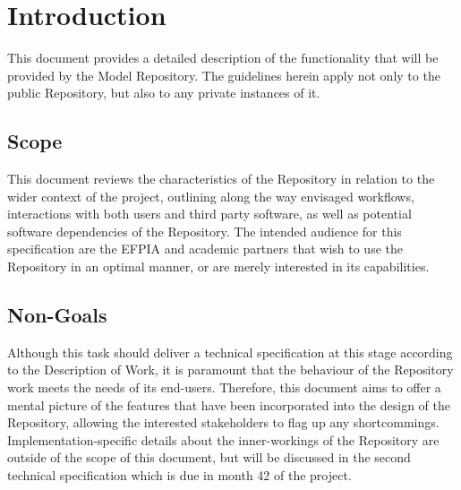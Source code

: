 \section{Introduction}
\label{introduction}
This document provides a detailed description of the functionality that will be provided by the \ddmore Model Repository. The guidelines herein apply not only to the public Repository, but also to any private instances of it.

\subsection{Scope}
This document reviews the characteristics of the Repository in relation to the wider context of the project, outlining along the way envisaged workflows, interactions with both users and third party software, as well as potential software dependencies of the Repository. The intended audience for this specification are the EFPIA and academic partners that wish to use the Repository in an optimal manner, or are merely interested in its capabilities.

\subsection{Non-Goals}
Although this task should deliver a technical specification at this stage according to the Description of Work, it is paramount that the behaviour of the Repository work meets the needs of its end-users. Therefore, this document aims to offer a mental picture of the features that have been incorporated into the design of the Repository, allowing the interested stakeholders to flag up any shortcommings. Implementation-specific details about the inner-workings of the Repository are outside of the scope of this document, but will be discussed in the second technical specification which is due in month 42 of the project. 

